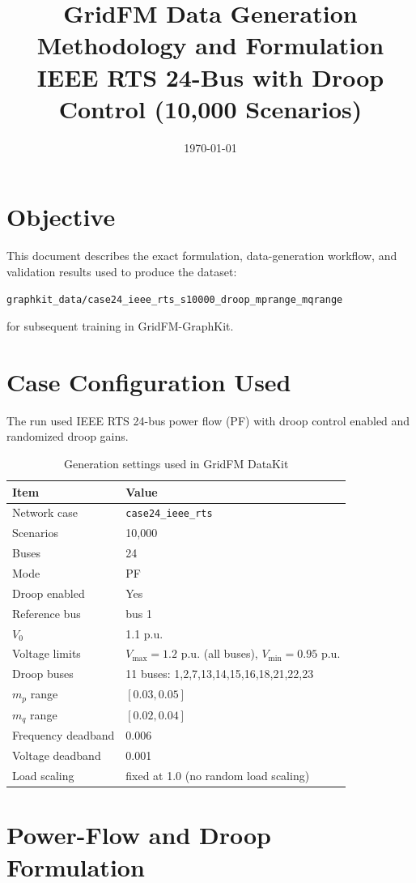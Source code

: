 ﻿\documentclass[11pt]{article}
\title{GridFM Data Generation Methodology and Formulation \\
IEEE RTS 24-Bus with Droop Control (10,000 Scenarios)}
\author{}
\date{\today}
\begin{document}
\maketitle

\section{Objective}
This document describes the exact formulation, data-generation workflow, and validation results used to produce the dataset:
\begin{center}
\texttt{graphkit\_data/case24\_ieee\_rts\_s10000\_droop\_mprange\_mqrange}
\end{center}
for subsequent training in GridFM-GraphKit.

\section{Case Configuration Used}
The run used IEEE RTS 24-bus power flow (PF) with droop control enabled and randomized droop gains.

\begin{table}[H]
\centering
\caption{Generation settings used in GridFM DataKit}
\begin{tabular}{ll}
\toprule
Item & Value \\
\midrule
Network case & \texttt{case24\_ieee\_rts} \\
Scenarios & 10,000 \\
Buses & 24 \\
Mode & PF \\
Droop enabled & Yes \\
Reference bus & bus 1 \\
$V_0$ & 1.1 p.u. \\
Voltage limits & $V_{\max}=1.2$ p.u. (all buses), $V_{\min}=0.95$ p.u. \\
Droop buses & 11 buses: 1,2,7,13,14,15,16,18,21,22,23 \\
$m_p$ range & $[0.03, 0.05]$ \\
$m_q$ range & $[0.02, 0.04]$ \\
Frequency deadband & 0.006 \\
Voltage deadband & 0.001 \\
Load scaling & fixed at 1.0 (no random load scaling) \\
\bottomrule
\end{tabular}
\end{table}

\section{Power-Flow and Droop Formulation}
\end{document}
